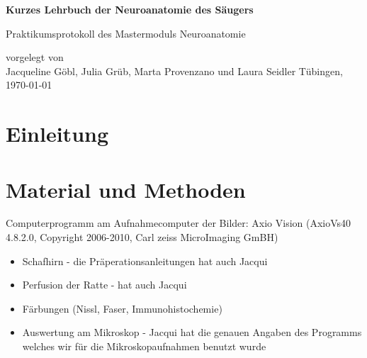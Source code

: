 \documentclass[12pt,a4paper,pdftex]{article}
\begin{document}
\setlength{\parindent}{0pt}


\begin{titlepage}
 \begin{center}
        \vspace*{1cm}
        \LARGE
        \textbf{Kurzes Lehrbuch der Neuroanatomie des Säugers}
        \vspace{2cm}
        
        \Large
        Praktikumsprotokoll des Mastermoduls Neuroanatomie
        \vspace{4cm}
        
        \large
        vorgelegt von \\ Jacqueline Göbl, Julia Grüb, Marta Provenzano und Laura Seidler %
        \vfill
        \large     
        T\"ubingen, \today
    \end{center}
    \newpage
        \thispagestyle{empty}
        \mbox{}
        \newpage
\end{titlepage}


\thispagestyle{empty}
\mbox{}

\tableofcontents
\newpage
\listoffigures


\newpage
\section{Einleitung}

\newpage
\section{Material und Methoden}

Computerprogramm am Aufnahmecomputer der Bilder:
Axio Vision (AxioVs40 4.8.2.0, Copyright 2006-2010, Carl zeiss MicroImaging GmBH)



\begin{itemize}
    \item Schafhirn - die Präperationsanleitungen hat auch Jacqui
    \item Perfusion der Ratte - hat auch Jacqui
    \item Färbungen (Nissl, Faser, Immunohistochemie)
    \item Auswertung am Mikroskop - Jacqui hat die genauen Angaben des Programms welches wir für die Mikroskopaufnahmen benutzt wurde
\end{itemize}
\end{document}
